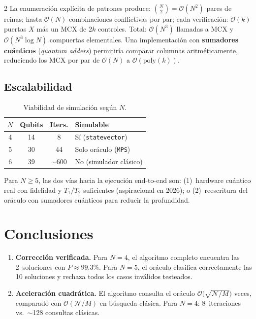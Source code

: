\documentclass[9pt, a4paper]{extarticle}
\newcommand{\BigO}{\mathcal{O}}
\begin{document}
\begin{multicols}{2}
La enumeraci\'on expl\'icita de patrones produce:
$\binom{N}{2} = \BigO(N^2)$ pares de reinas;
hasta $\BigO(N)$ combinaciones conflictivas por par;
cada verificaci\'on: $\BigO(k)$ puertas $X$ m\'as un MCX de $2k$ controles.
Total: $\BigO(N^3)$ llamadas a MCX y $\BigO(N^3 \log N)$ compuertas elementales.
Una implementaci\'on con \textbf{sumadores cu\'anticos} (\emph{quantum adders})
permitir\'ia comparar columnas aritm\'eticamente, reduciendo los MCX
por par de $\BigO(N)$ a $\BigO(\text{poly}(k))$.

\subsection{Escalabilidad}

\begin{table}[H]
    \centering
    \caption{Viabilidad de simulaci\'on seg\'un $N$.}
    \label{tab:scale}
    \scriptsize
    \begin{tabular}{@{}cccl@{}}
        \toprule
        $N$ & Qubits & Iters. & Simulable \\
        \midrule
        4 & 14 & 8    & S\'i (\texttt{statevector}) \\
        5 & 30 & 44   & Solo or\'aculo (\texttt{MPS}) \\
        6 & 39 & $\sim$600 & No (simulador cl\'asico) \\
        \bottomrule
    \end{tabular}
\end{table}

Para $N \geq 5$, las dos v\'ias hacia la ejecuci\'on end-to-end son:
(1)~hardware cu\'antico real con fidelidad y $T_1/T_2$ suficientes
(aspiracional en 2026); o (2)~reescritura del or\'aculo con sumadores
cu\'anticos para reducir la profundidad.

\section{Conclusiones}

\begin{enumerate}
    \item \textbf{Correcci\'on verificada.}
          Para $N\!=\!4$, el algoritmo completo encuentra las 2~soluciones
          con $P \approx 99.3\%$. Para $N\!=\!5$, el or\'aculo clasifica
          correctamente las 10 soluciones y rechaza todos los casos
          inv\'alidos testeados.

    \item \textbf{Aceleraci\'on cuadr\'atica.}
          El algoritmo consulta el or\'aculo
          $\BigO\!\big(\sqrt{\mathcal{N}/M}\big)$ veces, comparado con
          $\BigO(\mathcal{N}/M)$ en b\'usqueda cl\'asica.
          Para $N\!=\!4$: 8~iteraciones vs.\ $\sim$128 consultas cl\'asicas.


\end{enumerate}
\end{multicols}
\end{document}

